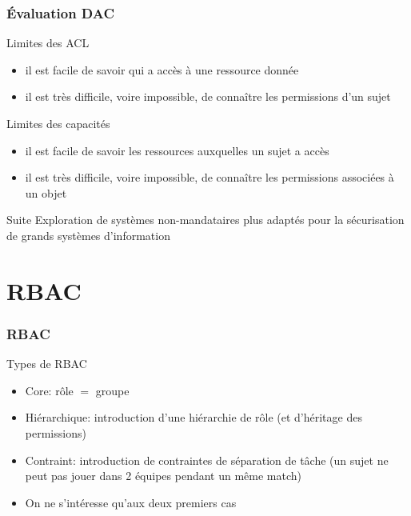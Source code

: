 \begin{reveals}
\begin{frame}
  \vfill


\end{frame}

 

\begin{frame}
  \frametitle{Évaluation DAC}

  \vfill

   \begin{block}{Limites des ACL}
     \begin{itemize}
     \item il est facile de savoir qui a accès à une ressource donnée
     \item il est très difficile, voire impossible, de connaître les permissions d'un sujet
     \end{itemize}
  \end{block}

  \vfill

   \begin{block}{Limites des capacités}
     \begin{itemize}
     \item il est facile de savoir les ressources auxquelles un sujet a accès
     \item il est très difficile, voire impossible, de connaître les permissions associées à un objet
     \end{itemize}
  \end{block}

  \vfill
  \begin{block}{Suite}
    Exploration de systèmes non-mandataires plus adaptés pour la
    sécurisation de grands systèmes d'information
  \end{block}

  \vfill
\end{frame}


\section{RBAC}

\begin{frame}
  \frametitle{RBAC}

  \vfill

  \begin{block}{Types de RBAC}
    \begin{itemize}
    \item Core: rôle \(=\) groupe
    \item Hiérarchique: introduction d'une hiérarchie de rôle (et d'héritage des permissions)
    \item Contraint: introduction de contraintes de séparation de
      tâche (un sujet ne peut pas jouer dans 2 équipes pendant un même match)
    \item On ne s'intéresse qu'aux deux premiers cas
    \end{itemize}
  \end{block}


\end{frame}
\end{reveals}
